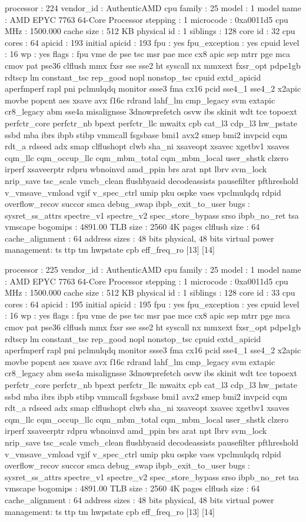 processor	: 224
vendor_id	: AuthenticAMD
cpu family	: 25
model		: 1
model name	: AMD EPYC 7763 64-Core Processor
stepping	: 1
microcode	: 0xa0011d5
cpu MHz		: 1500.000
cache size	: 512 KB
physical id	: 1
siblings	: 128
core id		: 32
cpu cores	: 64
apicid		: 193
initial apicid	: 193
fpu		: yes
fpu_exception	: yes
cpuid level	: 16
wp		: yes
flags		: fpu vme de pse tsc msr pae mce cx8 apic sep mtrr pge mca cmov pat pse36 clflush mmx fxsr sse sse2 ht syscall nx mmxext fxsr_opt pdpe1gb rdtscp lm constant_tsc rep_good nopl nonstop_tsc cpuid extd_apicid aperfmperf rapl pni pclmulqdq monitor ssse3 fma cx16 pcid sse4_1 sse4_2 x2apic movbe popcnt aes xsave avx f16c rdrand lahf_lm cmp_legacy svm extapic cr8_legacy abm sse4a misalignsse 3dnowprefetch osvw ibs skinit wdt tce topoext perfctr_core perfctr_nb bpext perfctr_llc mwaitx cpb cat_l3 cdp_l3 hw_pstate ssbd mba ibrs ibpb stibp vmmcall fsgsbase bmi1 avx2 smep bmi2 invpcid cqm rdt_a rdseed adx smap clflushopt clwb sha_ni xsaveopt xsavec xgetbv1 xsaves cqm_llc cqm_occup_llc cqm_mbm_total cqm_mbm_local user_shstk clzero irperf xsaveerptr rdpru wbnoinvd amd_ppin brs arat npt lbrv svm_lock nrip_save tsc_scale vmcb_clean flushbyasid decodeassists pausefilter pfthreshold v_vmsave_vmload vgif v_spec_ctrl umip pku ospke vaes vpclmulqdq rdpid overflow_recov succor smca debug_swap ibpb_exit_to_user
bugs		: sysret_ss_attrs spectre_v1 spectre_v2 spec_store_bypass srso ibpb_no_ret tsa vmscape
bogomips	: 4891.00
TLB size	: 2560 4K pages
clflush size	: 64
cache_alignment	: 64
address sizes	: 48 bits physical, 48 bits virtual
power management: ts ttp tm hwpstate cpb eff_freq_ro [13] [14]

processor	: 225
vendor_id	: AuthenticAMD
cpu family	: 25
model		: 1
model name	: AMD EPYC 7763 64-Core Processor
stepping	: 1
microcode	: 0xa0011d5
cpu MHz		: 1500.000
cache size	: 512 KB
physical id	: 1
siblings	: 128
core id		: 33
cpu cores	: 64
apicid		: 195
initial apicid	: 195
fpu		: yes
fpu_exception	: yes
cpuid level	: 16
wp		: yes
flags		: fpu vme de pse tsc msr pae mce cx8 apic sep mtrr pge mca cmov pat pse36 clflush mmx fxsr sse sse2 ht syscall nx mmxext fxsr_opt pdpe1gb rdtscp lm constant_tsc rep_good nopl nonstop_tsc cpuid extd_apicid aperfmperf rapl pni pclmulqdq monitor ssse3 fma cx16 pcid sse4_1 sse4_2 x2apic movbe popcnt aes xsave avx f16c rdrand lahf_lm cmp_legacy svm extapic cr8_legacy abm sse4a misalignsse 3dnowprefetch osvw ibs skinit wdt tce topoext perfctr_core perfctr_nb bpext perfctr_llc mwaitx cpb cat_l3 cdp_l3 hw_pstate ssbd mba ibrs ibpb stibp vmmcall fsgsbase bmi1 avx2 smep bmi2 invpcid cqm rdt_a rdseed adx smap clflushopt clwb sha_ni xsaveopt xsavec xgetbv1 xsaves cqm_llc cqm_occup_llc cqm_mbm_total cqm_mbm_local user_shstk clzero irperf xsaveerptr rdpru wbnoinvd amd_ppin brs arat npt lbrv svm_lock nrip_save tsc_scale vmcb_clean flushbyasid decodeassists pausefilter pfthreshold v_vmsave_vmload vgif v_spec_ctrl umip pku ospke vaes vpclmulqdq rdpid overflow_recov succor smca debug_swap ibpb_exit_to_user
bugs		: sysret_ss_attrs spectre_v1 spectre_v2 spec_store_bypass srso ibpb_no_ret tsa vmscape
bogomips	: 4891.00
TLB size	: 2560 4K pages
clflush size	: 64
cache_alignment	: 64
address sizes	: 48 bits physical, 48 bits virtual
power management: ts ttp tm hwpstate cpb eff_freq_ro [13] [14]

